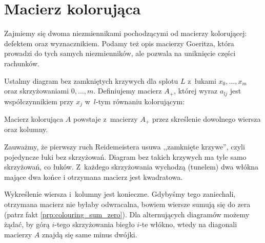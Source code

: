 
\section{Macierz kolorująca}
%
Zajmiemy się dwoma niezmiennikami pochodzącymi od macierzy kolorującej: defektem oraz wyznacznikiem.
Podamy też opis macierzy Goeritza, która prowadzi do tych samych niezmienników, ale pozwala na uniknięcie części rachunków.

\begin{definition}
    Ustalmy diagram bez zamkniętych krzywych dla splotu $L$ z~łukami $x_0, \ldots, x_m$ oraz skrzyżowaniami $0, \ldots, m$.
    Definiujemy macierz $A_+$, której wyraz $a_{lj}$ jest współczynnikiem przy $x_j$ w~$l$-tym równaniu kolorującym:
\begin{center}
\begin{comment}
    \LargePlusCrossingMatrix
\end{comment}
\end{center}
    Macierz kolorująca $A$ powstaje z~macierzy $A_+$ przez skreślenie dowolnego wiersza oraz kolumny.
\end{definition}

Zauważmy, że pierwszy ruch Reidemeistera usuwa ,,zamknięte krzywe'', czyli pojedyncze łuki bez skrzyżowań.
Diagram bez takich krzywych ma tyle samo skrzyżowań, co łuków.
Z~każdego skrzyżowania wychodzą (tunelem) dwa włókna mające dwa końce i otrzymana macierz jest kwadratowa.

Wykreślenie wiersza i~kolumny jest konieczne.
Gdybyśmy tego zaniechali, otrzymana macierz nie byłaby odwracalna, bowiem wiersze sumują się do zera (patrz fakt \ref{prp:colouring_sum_zero}).
Dla alternujących diagramów możemy żądać, by górą $i$-tego skrzyżowania biegło $i$-te włókno, wtedy na diagonali macierzy $A$ znajdą się same minus dwójki.









